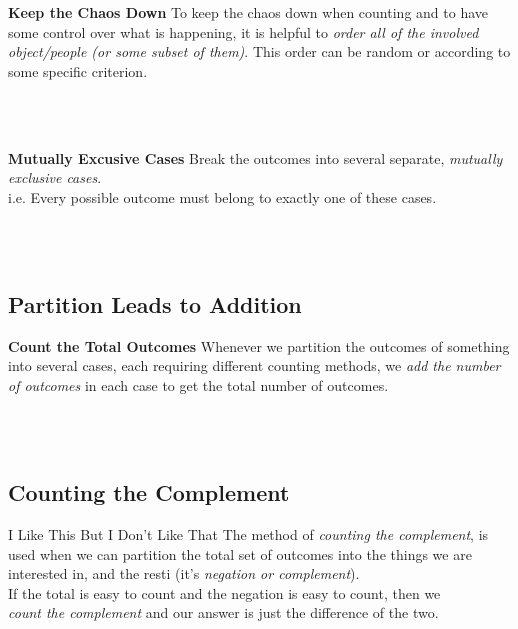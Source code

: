 \documentclass{article}
\begin{document}
\begin{mybox}{\textbf{Keep the Chaos Down}}
To keep the chaos down when counting and to have some control over what is happening, it is helpful to \textit{order all of the involved object/people (or some subset of them)}. This order can be random or according to some specific criterion. 
\end{mybox}
\\ \\

\begin{mybox}{\textbf{Mutually Excusive Cases}}
Break the outcomes into several separate, \textit{mutually exclusive cases}. \\
i.e. Every possible outcome must belong to exactly one of these cases. 
\end{mybox}
\\ \\


\subsection*{Partition Leads to Addition}
\bigskip


\begin{mybox}{\textbf{Count the Total Outcomes}}
Whenever we partition the outcomes of something into several cases, each requiring different counting methods, we \textit{add the number of outcomes} in each case to get the total number of outcomes. 
\end{mybox}
\\ \\


\subsection*{Counting the Complement}
\bigskip


\begin{mybox}{I Like This But I Don't Like That}
    The method of \textit{counting the complement}, is used when we can partition the total set of outcomes into the things we are interested in, and the resti (it's \textit{negation or complement}). \\
    If the total is easy to count and the negation is easy to count, then we\\ \textit{count the complement} and our answer is just the difference of the two.  
\end{mybox}
\\ \\


\end{document}
